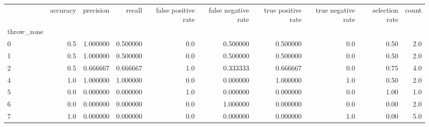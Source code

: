 \begin{tabular}{lrrrrrrrrr}
\toprule
{} &  accuracy &  precision &    recall &  false positive rate &  false negative rate &  true positive rate &  true negative rate &  selection rate &  count \\
throw\_zone &           &            &           &                      &                      &                     &                     &                 &        \\
\midrule
0          &       0.5 &   1.000000 &  0.500000 &                  0.0 &             0.500000 &            0.500000 &                 0.0 &            0.50 &    2.0 \\
1          &       0.5 &   1.000000 &  0.500000 &                  0.0 &             0.500000 &            0.500000 &                 0.0 &            0.50 &    2.0 \\
2          &       0.5 &   0.666667 &  0.666667 &                  1.0 &             0.333333 &            0.666667 &                 0.0 &            0.75 &    4.0 \\
4          &       1.0 &   1.000000 &  1.000000 &                  0.0 &             0.000000 &            1.000000 &                 1.0 &            0.50 &    2.0 \\
5          &       0.0 &   0.000000 &  0.000000 &                  1.0 &             0.000000 &            0.000000 &                 0.0 &            1.00 &    1.0 \\
6          &       0.0 &   0.000000 &  0.000000 &                  0.0 &             1.000000 &            0.000000 &                 0.0 &            0.00 &    2.0 \\
7          &       1.0 &   0.000000 &  0.000000 &                  0.0 &             0.000000 &            0.000000 &                 1.0 &            0.00 &    5.0 \\
\bottomrule
\end{tabular}
